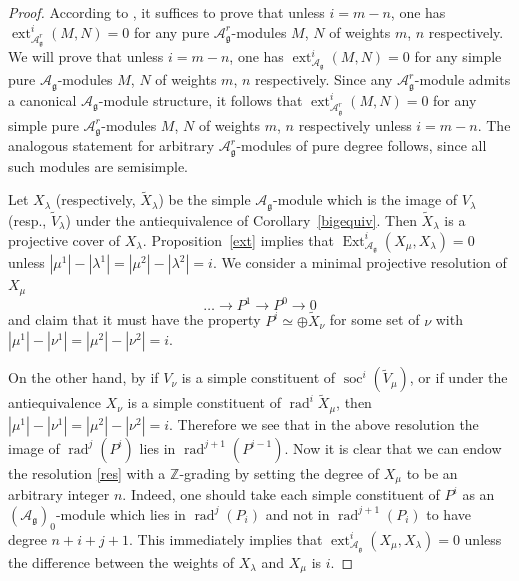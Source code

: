 \documentclass{amsart}
\renewcommand{\gg}{\mathfrak{g}}
\newcommand{\rad}{\operatorname{rad}}
\theoremstyle{definition}
\numberwithin{equation}{section}
\begin{document}
\begin{proof} 
According to \cite[Proposition 2.1.3]{BGS}, it suffices to prove that  unless $i = m - n$, one has $\operatorname{ext}^i_{\mathcal{A}^r_\gg} (M , N) = 0$ for any pure $\mathcal{A}^r_\gg$-modules $M$, $N$ of weights $m$, $n$ respectively.  We will prove that unless $i = m - n$, one has $\operatorname{ext}^i_{\mathcal{A}_\gg} (M , N) = 0$ for any simple pure $\mathcal{A}_\gg$-modules $M$, $N$ of weights $m$, $n$ respectively.  Since any $\mathcal A^r_\gg$-module admits a canonical $\mathcal A_\gg$-module structure, it follows that $\operatorname{ext}^i_{\mathcal{A}^r_\gg} (M , N) = 0$ for any simple pure $\mathcal{A}^r_\gg$-modules $M$, $N$ of weights $m$, $n$ respectively unless $i = m-n$.  The analogous statement for arbitrary $\mathcal A^r_\gg$-modules of pure degree follows, since all such modules are semisimple. 

Let $X_\lambda$ (respectively, $\tilde X_\lambda$) be the simple $\mathcal A_\gg$-module which is the image of $V_\lambda$ (resp., $\tilde V_\lambda$) under the antiequivalence of Corollary~\ref{bigequiv}. Then  $\tilde X_\lambda$
is a projective cover of  $X_\lambda$. Proposition~\ref{ext} implies
that  $\operatorname{Ext}^i_{\mathcal A_\gg}(X_\mu,X_\lambda)=0$ unless
$|\mu^1|-|\lambda^1|=|\mu^2|-|\lambda^2|=i$. We consider a minimal
projective resolution of $X_\mu$
\begin{equation}\label{res}
\dots\to P^1\to P^0\to 0
\end{equation}
and claim that it must have the property $P^i \simeq \oplus\tilde X_\nu$ for some set of $\nu$ with $|\mu^1|-|\nu^1|=|\mu^2|-|\nu^2|=i$.

On the other hand, by \cite{PStyr} if $V_\nu$ is a simple constituent of
$\operatorname{soc}^i (\tilde V_\mu)$, or if under the antiequivalence $X_\nu$ is a simple constituent of
$\operatorname{rad}^i \tilde X_\mu$,  then   $|\mu^1|-|\nu^1|=|\mu^2|-|\nu^2|=i$.
Therefore we see that in the above resolution the image of $\rad^j(P^i)$ lies in $\rad^{j+1}(P^{i-1})$. Now it is clear that we can endow the resolution \eqref{res} with a
$\mathbb Z$-grading by setting the degree of $X_\mu$ to be an
arbitrary integer $n$.  Indeed, one should take each simple constituent of $P^i$ as an $(\mathcal A_\gg)_0$-module which lies in $\rad^j (P_i)$ and not in $\rad^{j+1} (P_i)$ to have degree $n+ i + j +1$.
This immediately implies that $\operatorname{ext}_{\mathcal A_\gg}^i(X_\mu, X_\lambda)=0$ unless the difference between the weights of $X_\lambda$ and $X_\mu$ is $i$.
\end{proof}
\end{document}
